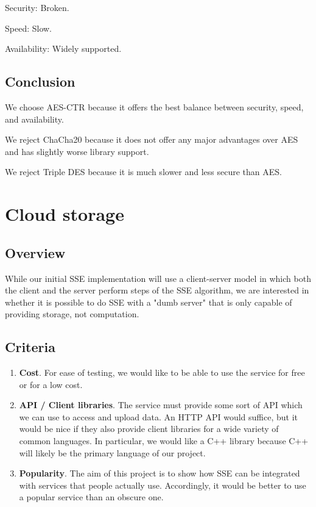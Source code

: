 Security: Broken.

Speed: Slow.

Availability: Widely supported.

\subsection{ Conclusion }

We choose AES-CTR because it offers the best balance between security, speed, and availability.

We reject ChaCha20 because it does not offer any major advantages over AES and has slightly worse library support.

We reject Triple DES because it is much slower and less secure than AES.

\section{ Cloud storage }

\subsection{ Overview }

While our initial SSE implementation will use a client-server model in which both the client and the server perform steps of the SSE algorithm, we are interested in whether it is possible to do SSE with a "dumb server" that is only capable of providing storage, not computation.

\subsection{ Criteria }

\begin{enumerate}
  \item \textbf{Cost}.
  For ease of testing, we would like to be able to use the service for free or for a low cost.

  \item \textbf{API / Client libraries}.
  The service must provide some sort of API which we can use to access and upload data. An HTTP API would suffice, but it would be nice if they also provide client libraries for a wide variety of common languages. In particular, we would like a C++ library because C++ will likely be the primary language of our project.

  \item \textbf{Popularity}.
  The aim of this project is to show how SSE can be integrated with services that people actually use.
  Accordingly, it would be better to use a popular service than an obscure one.
\end{enumerate}

